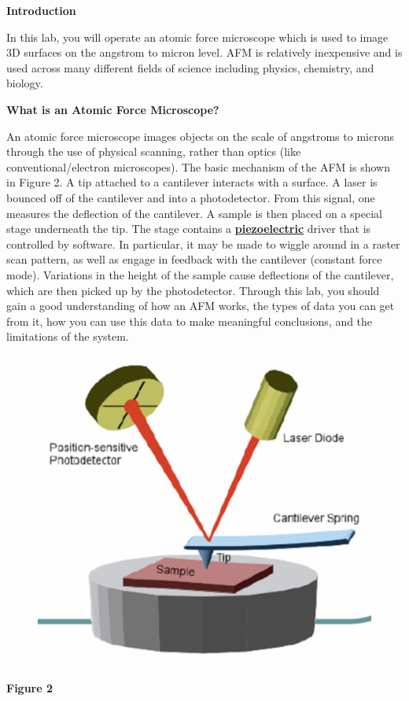 \documentclass{../lab}
\begin{document}
\textbf{Introduction}

In this lab, you will operate an atomic force microscope which is used to image 3D surfaces on the angstrom to micron level.  AFM is relatively inexpensive and is used across many different fields of science including physics, chemistry, and biology.

\textbf{What is an Atomic Force Microscope? }

An atomic force microscope images objects on the scale of angstroms to microns through the use of physical scanning, rather than optics (like conventional/electron microscopes).  The basic mechanism of the AFM is shown in Figure 2.  A tip attached to a cantilever interacts with a surface. A laser is bounced off of the cantilever and into a photodetector. From this signal, one measures the deflection of the cantilever. A sample is then placed on a special stage underneath the tip. The stage contains a \href{https://en.wikipedia.org/wiki/Piezoelectricity}{\textbf{piezoelectric}} driver that is controlled by software. In particular, it may be made to wiggle around in a raster scan pattern, as well as engage in feedback with the cantilever (constant force mode). Variations in the height of the sample cause deflections of the cantilever, which are then picked up by the photodetector.  Through this lab, you should gain a good understanding of how an AFM works, the types of data you can get from it, how you can use this data to make meaningful conclusions, and the limitations of the system.


\begin{figure}[h]
    \centering
    \href{http://dev-physicsadv.pantheon.berkeley.edu/sites/default/files/AFMImages/2_0.png}{\includegraphics[width=0.5\linewidth]{images/2_0.png}}
    \caption{}
    \label{fig:2_0}
\end{figure}

\textbf{Figure 2}
\end{document}
